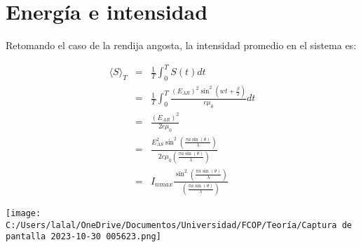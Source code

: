 \documentclass{article}
\begin{document}
        \section{Energía e intensidad}
        Retomando el caso de la rendija angosta, la intensidad 
        promedio en el sistema es:

        \begin{eqnarray}
            \langle S \rangle_T &=& 
            \frac{1}{T} \int_{0}^{T} S(t)dt\\
            &=& \frac{1}{T} \int_{0}^{T}
            \frac{(E_{AR})^2\sin^2(wt+\frac{\beta}{2})}{c\mu_0}dt\\
            &=& \frac{(E_{AR})^2}{2c\mu_0}\\
            &=& \frac{E_{AS}^2\sin^2(\frac{\pi a\sin(\theta)}{\lambda})}
            {2c\mu_0(\frac{\pi a \sin(\theta)}{\lambda})}\\
            &=& I_{nmax} \frac{\sin^2(\frac{\pi a \sin(\theta)}{\lambda})}
            {(\frac{\pi a \sin(\theta)}{\lambda})}    
        \end{eqnarray}


        \texttt{[image: C:/Users/lalal/OneDrive/Documentos/Universidad/FCOP/Teoría/Captura de pantalla 2023-10-30 005623.png]}
        

        
\end{document}
